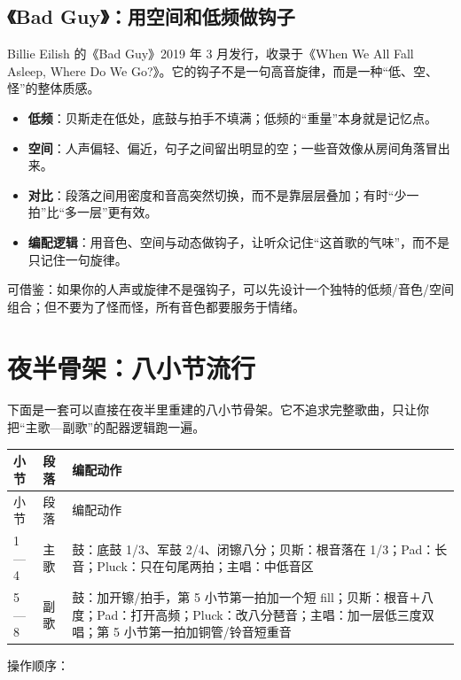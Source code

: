 \subsection{《Bad Guy》：用空间和低频做钩子}
\label{sec:pop-case-bad-guy}

Billie Eilish 的《Bad Guy》2019 年 3 月发行，收录于《When We All Fall Asleep, Where Do We Go?》。它的钩子不是一句高音旋律，而是一种“低、空、怪”的整体质感。

\begin{itemize}
\item \textbf{低频}：贝斯走在低处，底鼓与拍手不填满；低频的“重量”本身就是记忆点。
\item \textbf{空间}：人声偏轻、偏近，句子之间留出明显的空；一些音效像从房间角落冒出来。
\item \textbf{对比}：段落之间用密度和音高突然切换，而不是靠层层叠加；有时“少一拍”比“多一层”更有效。
\item \textbf{编配逻辑}：用音色、空间与动态做钩子，让听众记住“这首歌的气味”，而不是只记住一句旋律。
\end{itemize}

可借鉴：如果你的人声或旋律不是强钩子，可以先设计一个独特的低频/音色/空间组合；但不要为了怪而怪，所有音色都要服务于情绪。

\section{夜半骨架：八小节流行}
\label{sec:pop-yeban}

下面是一套可以直接在夜半里重建的八小节骨架。它不追求完整歌曲，只让你把“主歌—副歌”的配器逻辑跑一遍。

\begin{longtable}{p{}p{}p{}}
\toprule
小节 & 段落 & 编配动作 \\
\midrule
\endfirsthead
\toprule
小节 & 段落 & 编配动作 \\
\midrule
\endhead
1—4 & 主歌 & 鼓：底鼓 1/3、军鼓 2/4、闭镲八分；贝斯：根音落在 1/3；Pad：长音；Pluck：只在句尾两拍；主唱：中低音区 \\
5—8 & 副歌 & 鼓：加开镲/拍手，第 5 小节第一拍加一个短 fill；贝斯：根音＋八度；Pad：打开高频；Pluck：改八分琶音；主唱：加一层低三度双唱；第 5 小节第一拍加铜管/铃音短重音 \\
\bottomrule
\end{longtable}

操作顺序：

